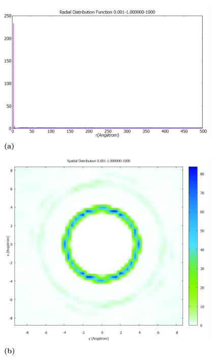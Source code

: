 \begin{figure}[H]
	\centering
	\begin{minipage}[b]{0.45\textwidth}
		\centering
		\includegraphics[width=0.95\textwidth]{grafico_3x01_0.001-1.png} %
		\textbf{(a)}
		\vspace{0.75cm}
	\end{minipage}%
	\hfill
	\begin{minipage}[b]{0.45\textwidth}
		\centering
		\includegraphics[width=0.95\textwidth]{grafico_3x05_0.001-1_distribucion.png} %
		\textbf{(b)}
	\end{minipage}
	

\end{figure}

